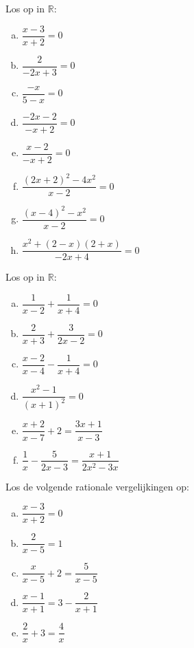 \documentclass[12pt]{article}
\begin{document}
\begin{oefening}
Los op in $\mathbb{R}$:
\begin{multicols}{2}
\begin{enumerate}[(a)]
  \itemsep1em
  \item $\dfrac{x-3}{x+2}=0$
  \item $\dfrac{2}{-2x+3}=0$
  \item $\dfrac{-x}{5-x}=0$
  \item $\dfrac{-2x-2}{-x+2}=0$
  \item $\dfrac{x-2}{-x+2}=0$
  \item $\dfrac{(2x+2)^2-4x^2}{x-2}=0$
  \item $\dfrac{(x-4)^2-x^2}{x-2}=0$
  \item $\dfrac{x^2+(2-x)(2+x)}{-2x+4}=0$
\end{enumerate}
\end{multicols}
\end{oefening}

\begin{oefening}
Los op in $\mathbb{R}$:
\begin{multicols}{2}
\begin{enumerate}[(a)]
  \itemsep1em
  \item $\dfrac{1}{x-2}+\dfrac{1}{x+4}=0$
  \item $\dfrac{2}{x+3}+\dfrac{3}{2x-2}=0$
  \item $\dfrac{x-2}{x-4}-\dfrac{1}{x+4}=0$
  \item $\dfrac{x^2-1}{(x+1)^2}=0$
  \item $\dfrac{x+2}{x-7}+2=\dfrac{3x+1}{x-3}$
  \item $\dfrac{1}{x}-\dfrac{5}{2x-3}=\dfrac{x+1}{2x^2-3x}$
\end{enumerate}
\end{multicols}
\end{oefening}

\begin{oefening}  %
Los de volgende rationale vergelijkingen op:
\begin{enumerate}[(a)]
  \itemsep1em
  \item $\dfrac{x-3}{x+2}=0$
  \item $\dfrac{2}{x-5}=1$
  \item $\dfrac{x}{x-5}+2=\dfrac{5}{x-5}$
  \item $\dfrac{x-1}{x+1}=3-\dfrac{2}{x+1}$
  \item $\dfrac{2}{x}+3=\dfrac{4}{x}$
\end{enumerate}
\end{oefening}
\end{document}
